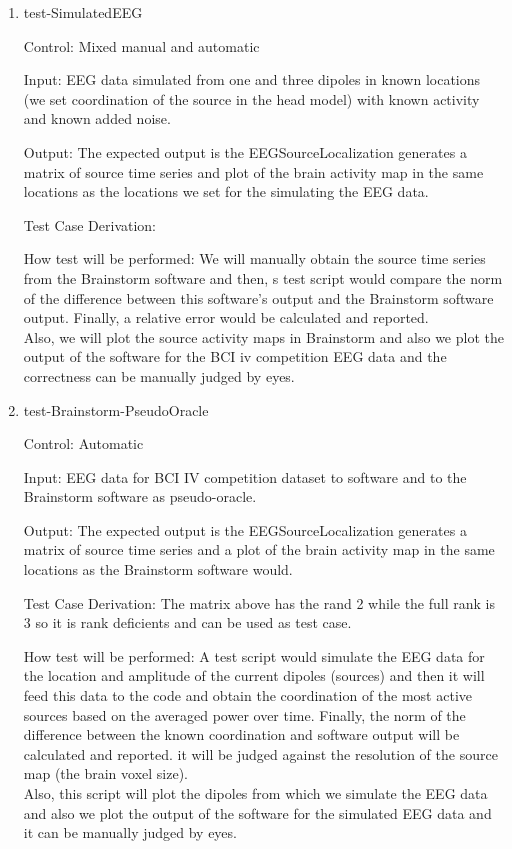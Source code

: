 \documentclass[12pt, titlepage]{article}
\renewcommand{\progname}{EEGSourceLocalization}
\begin{document}
\begin{enumerate}
\item{test-SimulatedEEG\\}

Control: Mixed manual and automatic
					
Input: EEG data simulated from one and three dipoles in known locations (we set coordination of the source in the head model) with known activity and known added noise.
					
Output: The expected output is the \progname{} generates a matrix of source time series and plot of the brain activity map in the same locations as the locations we set for the simulating the EEG data.

Test Case Derivation: 

How test will be performed: We will manually obtain the source time series from the Brainstorm software and then, s test script would compare the norm of the difference between this software's output and the Brainstorm software output. Finally, a relative error would be calculated and reported.\\
Also, we will plot the source activity maps in Brainstorm and also we plot the output of the software for the BCI iv competition EEG data and the correctness can be manually judged by eyes. 


\item{test-Brainstorm-PseudoOracle\\}

Control: Automatic
					
Input: EEG data for BCI IV competition dataset \cite{dataset1BCIcompetitionIV} to software and to the Brainstorm software as pseudo-oracle. 

Output: The expected output is the \progname{} generates a matrix of source time series and a plot of the brain activity map in the same locations as the Brainstorm software would.

Test Case Derivation: The matrix above has the rand 2 while the full rank is 3 so it is rank deficients and can be used as test case.

How test will be performed: A test script would simulate the EEG data for the location and amplitude of the current dipoles (sources) and then it will feed this data to the code and obtain the coordination of the most active sources based on the averaged power over time. Finally, the norm of the difference between the known coordination and software output will be calculated and reported. it will be judged against the resolution of the source map (the brain voxel size).\\
 Also, this script will plot the dipoles from which we simulate the EEG data and also we plot the output of the software for the simulated EEG data and it can be manually judged by eyes. 


\end{enumerate}
\end{document}
